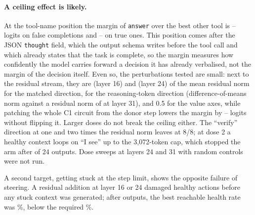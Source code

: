 \paragraph{A ceiling effect is likely.}\label{par:ceiling} At the tool-name position the margin of \texttt{answer} over the best other tool is \margPosMin--\margPosMax{} logits on false completions and \margNegMin--\margNegMax{} on true ones. This position comes after the JSON \texttt{thought} field, which the output schema writes before the tool call and which already states that the task is complete, so the margin measures how confidently the model carries forward a decision it has already verbalised, not the margin of the decision itself. %
Even so, the perturbations tested are small: next to the residual stream, they are \doseSixteen{} (layer 16) and \doseTwentyFour{} (layer 24) of the mean residual norm for the matched direction, \doseThink{} for the reasoning-token direction (difference-of-means norm \thinkScale{} against a residual norm of \thinkRThirtyOne{} at layer 31), and 0.5 for the value axes, %
while patching the whole C1 circuit from the donor step lowers the margin by \cjDeltaMin--\cjDeltaMax{} logits without flipping it. Larger doses do not break the ceiling either. The ``verify'' direction at one and two times the residual norm leaves \fsp{} at 8/8; at dose 2 a healthy context loops on ``I see'' up to the 3{,}072-token cap, which stopped the arm after \verifyRejCompleted{} of 24 outputs. %
Dose sweeps at layers 24 and 31 with random controls were not run.

A second target, getting stuck at the step limit, shows the opposite failure of steering. A residual addition at layer 16 or 24 damaged healthy actions before any stuck context was generated; after \stuckSixteenObs{} outputs, the best reachable health rate was \stuckSixteenBest\%, below the required \stuckSixteenReq\%. %


